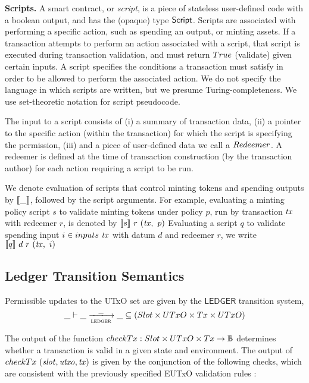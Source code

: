 \textbf{Scripts. } A smart contract, or \emph{script},
is a piece of stateless user-defined code with a
boolean output, and has the (opaque) type $\textsf{Script}$. Scripts are associated
with performing a specific
action, such as spending an output, or minting assets. If a transaction
attempts to perform an action associated with a script, that script is executed
during transaction validation, and must return $\True$ (validate) given certain
inputs. A script specifies the
conditions a transaction must satisfy in order to be allowed to perform the
associated action. We do not specify the language in which scripts are written,
but we presume Turing-completeness. We use set-theoretic notation for script
pseudocode.

The input to a script consists of (i) a summary of transaction data,
(ii) a pointer to the specific action (within the transaction) for which the script
is specifying the permission,
(iii) and a piece of user-defined data we call a $\Redeemer$. A redeemer is defined
at the time of transaction construction (by the transaction author) for each action
requiring a script to be
run.

We denote evaluation of scripts that control
minting tokens and spending outputs by $\llbracket\_\rrbracket$, followed by the
script arguments.
For example, evaluating a minting policy script $s$ to validate
minting tokens under policy $p$, run by transaction $\mathit{tx}$ with redeemer $r$, is denoted by
$\llbracket s\rrbracket~r~(\mathit{tx},~p)$
Evaluating a script $q$ to validate spending input $i \in \inputs~\var{tx}$ with
datum $d$ and redeemer $r$, we write $\llbracket q\rrbracket~d~r~(\mathit{tx},~i)$

\subsection{Ledger Transition Semantics}
\label{sec:ledgersem}

Permissible updates to the UTxO set are given by the $\mathsf{LEDGER}$ transition
system,
  \begin{equation*}
    \_ \vdash
    \var{\_} \trans{ledger}{\_} \var{\_}
    \subseteq (\Slot \times \UTxO \times \Tx \times \UTxO)
  \end{equation*}

The output of the function $\fun{checkTx} : \Slot \times \UTxO \times \Tx \to \B$
determines whether a transaction is valid
in a given state and environment. The output of $\fun{checkTx}~(\var{slot}, \var{utxo}, \var{tx})$
is given by the conjunction of the following checks, which are consistent with the previously
specified EUTxO validation rules \cite{eutxoma} :

